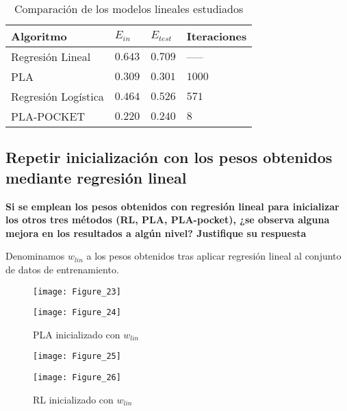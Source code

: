\begin{table}[H]
    \centering
    \begin{tabular}{llll} \toprule
        Algoritmo & $E_{in}$ & $E_{test}$ & Iteraciones \\ \midrule
        Regresión Lineal& $0.643$ & $0.709$ & ----- \\ 
        PLA & $0.309$ & $0.301$ & $1000$ \\ 
        Regresión Logística & $0.464$ & $0.526$ & $571$ \\ 
        PLA-POCKET & $0.220$ & $0.240$ & $8$ \\ \bottomrule
    \end{tabular}
    \caption{Comparación de los modelos lineales estudiados}
\end{table}

\subsection{Repetir inicialización con los pesos obtenidos mediante regresión lineal}

\textbf{Si se emplean los pesos obtenidos con regresión lineal para inicializar
los otros tres métodos (RL, PLA, PLA-pocket), ¿se observa alguna mejora en
los resultados a algún nivel? Justifique su respuesta}

Denominamos $w_{lin}$ a los pesos obtenidos tras aplicar regresión lineal al conjunto
de datos de entrenamiento.

\begin{figure}[H]
    \caption{PLA inicializado con $w_{lin}$ \medskip}
    \begin{minipage}[b]{.5\linewidth}
      \centering
      \texttt{[image: Figure\_23]}
       \label{subfig-5:dummy66}
    \end{minipage}
    \hfill \hfill
    \begin{minipage}[b]{.5\linewidth}
      \centering
      \texttt{[image: Figure\_24]}
    \end{minipage}
    \label{fig:dummy66}
\end{figure}

\begin{figure}[H]
    \caption{RL inicializado con $w_{lin}$ \medskip}
    \begin{minipage}[b]{.5\linewidth}
      \centering
      \texttt{[image: Figure\_25]}
       \label{subfig-5:dummy67}
    \end{minipage}
    \hfill \hfill
    \begin{minipage}[b]{.5\linewidth}
      \centering
      \texttt{[image: Figure\_26]}
    \end{minipage}
    \label{fig:dummy67}
\end{figure}


